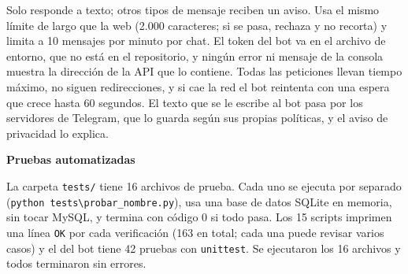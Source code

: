\documentclass[journal,onecolumn,12pt,draftclsnofoot]{IEEEtran}
\newcommand{\apartado}[1]{\par\medskip\noindent\textbf{#1}\par\smallskip}
\begin{document}
Solo responde a texto; otros tipos de mensaje reciben un aviso. Usa el mismo límite de largo que la web (2.000 caracteres; si se pasa, rechaza y no recorta) y limita a 10 mensajes por minuto por chat. El token del bot va en el archivo de entorno, que no está en el repositorio, y ningún error ni mensaje de la consola muestra la dirección de la API que lo contiene. Todas las peticiones llevan tiempo máximo, no siguen redirecciones, y si cae la red el bot reintenta con una espera que crece hasta 60 segundos. El texto que se le escribe al bot pasa por los servidores de Telegram, que lo guarda según sus propias políticas, y el aviso de privacidad lo explica.

\apartado{Pruebas automatizadas}

La carpeta \texttt{tests/} tiene 16 archivos de prueba. Cada uno se ejecuta por separado (\texttt{python tests\textbackslash probar\_nombre.py}), usa una base de datos SQLite en memoria, sin tocar MySQL, y termina con código 0 si todo pasa. Los 15 scripts imprimen una línea \texttt{OK} por cada verificación (163 en total; cada una puede revisar varios casos) y el del bot tiene 42 pruebas con \texttt{unittest}. Se ejecutaron los 16 archivos y todos terminaron sin errores.
\end{document}
